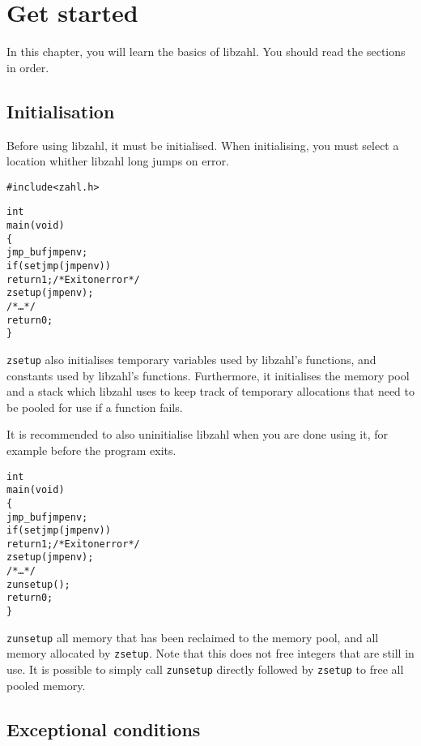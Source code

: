 \chapter{Get started}
\label{chap:Get started}

In this chapter, you will learn the basics of libzahl.
You should read the sections in order.

\vspace{1cm}
\minitoc


\newpage
\section{Initialisation}
\label{sec:Initialisation}

Before using libzahl, it must be initialised. When
initialising, you must select a location whither libzahl
long jumps on error.

\begin{alltt}
   #include <zahl.h>

   int
   main(void)
   \{
       jmp_buf jmpenv;
       if (setjmp(jmpenv))
           return 1; \textcolor{c}{/* \textrm{Exit on error} */}
       zsetup(jmpenv);
       \textcolor{c}{/* \textrm{\ldots} */}
       return 0;
   \}
\end{alltt}

{\tt zsetup} also initialises temporary variables used
by libzahl's functions, and constants used by libzahl's
functions. Furthermore, it initialises the memory pool
and a stack which libzahl uses to keep track of temporary
allocations that need to be pooled for use if a function
fails.

It is recommended to also uninitialise libzahl when you
are done using it, for example before the program exits.

\begin{alltt}
   \textcolor{c}{int
   main(void)
   \{
       jmp_buf jmpenv;
       if (setjmp(jmpenv))
           return 1; /* \textrm{Exit on error} */
       zsetup(jmpenv);
       /* \textrm{\ldots} */}
       zunsetup();
       \textcolor{c}{return 0;
   \}}
\end{alltt}

{\tt zunsetup} all memory that has been reclaimed to
the memory pool, and all memory allocated by {\tt zsetup}.
Note that this does not free integers that are still
in use. It is possible to simply call {\tt zunsetup}
directly followed by {\tt zsetup} to free all pooled
memory.


\newpage
\section{Exceptional conditions}
\label{sec:Exceptional conditions}

